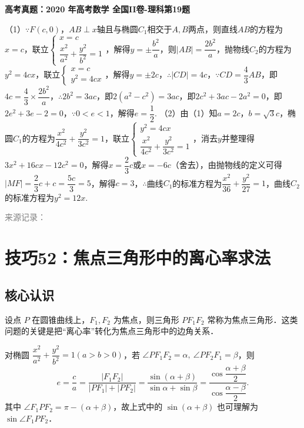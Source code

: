 \documentclass[UTF8,a4paper,11pt]{ctexart}
\newenvironment{gaokao}[1]{\par\medskip\noindent\textbf{高考真题：#1}\par\smallskip}{\par\medskip}
\begin{document}
\begin{gaokao}{2020 年高考数学 全国II卷-理科第19题}
（1）$\because F(c,0)$，$AB\perp x$轴且与椭圆$C_1$相交于$A,B$两点，则直线$AB$的方程为$x=c$，联立$\begin{cases}x=c\\\dfrac{x^2}{a^2}+\dfrac{y^2}{b^2}=1\end{cases}$，解得$y=\pm\dfrac{b^2}{a}$，则$|AB|=\dfrac{2b^2}{a}$，抛物线$C_2$的方程为$y^2=4cx$，联立$\begin{cases}x=c\\y^2=4cx\end{cases}$，解得$y=\pm2c$，$\therefore |CD|=4c$，$\because CD=\dfrac43AB$，即$4c=\dfrac43\times\dfrac{2b^2}{a}$，$\therefore 2b^2=3ac$，即$2(a^2-c^2)=3ac$，即$2c^2+3ac-2a^2=0$，即$2e^2+3e-2=0$，$\because 0<e<1$，解得$e=\dfrac12$.
（2）由（1）知$a=2c$，$b=\sqrt3c$，椭圆$C_1$的方程为$\dfrac{x^2}{4c^2}+\dfrac{y^2}{3c^2}=1$，联立$\begin{cases}y^2=4cx\\\dfrac{x^2}{4c^2}+\dfrac{y^2}{3c^2}=1\end{cases}$，消去$y$并整理得$3x^2+16cx-12c^2=0$，解得$x=\dfrac23c$或$x=-6c$（舍去），由抛物线的定义可得$|MF|=\dfrac23c+c=\dfrac{5c}{3}=5$，解得$c=3$，$\therefore$曲线$C_1$的标准方程为$\dfrac{x^2}{36}+\dfrac{y^2}{27}=1$，曲线$C_2$的标准方程为$y^2=12x$.

\par\smallskip\textcolor{gray}{\footnotesize 来源记录：\texttt{}}

\end{gaokao}

\clearpage

\section{技巧52：焦点三角形中的离心率求法}

\subsection*{核心认识}

设点 $P$ 在圆锥曲线上，$F_1,F_2$ 为焦点，则三角形 $PF_1F_2$ 常称为焦点三角形．这类问题的关键是把“离心率”转化为焦点三角形中的边角关系．

对椭圆 $\dfrac{x^2}{a^2}+\dfrac{y^2}{b^2}=1(a>b>0)$，若 $\angle PF_1F_2=\alpha,\ \angle PF_2F_1=\beta$，则
\[
e=\frac{c}{a}=\frac{|F_1F_2|}{|PF_1|+|PF_2|}
=\frac{\sin(\alpha+\beta)}{\sin\alpha+\sin\beta}
=\frac{\cos\dfrac{\alpha+\beta}{2}}{\cos\dfrac{\alpha-\beta}{2}}.
\]
其中 $\angle F_1PF_2=\pi-(\alpha+\beta)$，故上式中的 $\sin(\alpha+\beta)$ 也可理解为 $\sin\angle F_1PF_2$．
\end{document}
